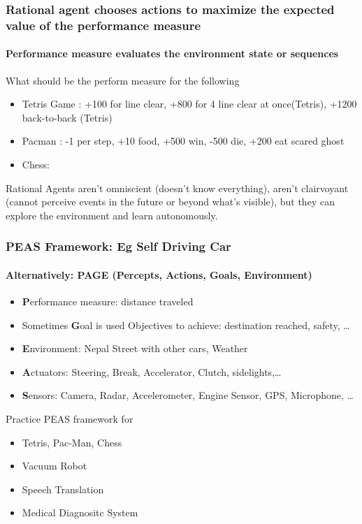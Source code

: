 \documentclass{beamer}
\begin{document}
\begin{frame}
  \frametitle{Rational agent chooses actions to maximize the expected value of the performance measure}
  \framesubtitle{Performance measure evaluates the environment state or sequences}
  What should be the perform measure for the following

  \begin{itemize}
    \item Tetris Game : +100 for line clear, +800 for 4 line clear at once(Tetris), +1200 back-to-back (Tetris)
    \item Pacman : -1 per step, +10 food, +500 win, -500 die, +200 eat scared ghost
    \item Chess:
  \end{itemize}
  
  Rational Agents aren't omniscient (doesn't know everything), aren't clairvoyant (cannot perceive events in the future or beyond what's visible), but they can explore the environment and learn autonomously.

\end{frame}

\begin{frame}
  \frametitle{PEAS Framework: Eg Self Driving Car}
  \framesubtitle{Alternatively: PAGE (Percepts, Actions, Goals, Environment)}
  \begin{itemize}
    \item \textbf{P}erformance measure: distance traveled
    \item Sometimes \textbf{G}oal is used Objectives to achieve: destination reached, safety, \dots
    \item \textbf{E}nvironment: Nepal Street with other cars, Weather
    \item \textbf{A}ctuators: Steering, Break, Accelerator, Clutch, sidelights,\dots
    \item \textbf{S}ensors: Camera, Radar, Accelerometer, Engine Sensor, GPS, Microphone, \dots
  \end{itemize}

  Practice PEAS framework for 
  \begin{itemize}
    \item Tetris, Pac-Man, Chess
    \item Vacuum Robot
    \item Speech Translation
    \item Medical Diagnositc System
  \end{itemize}

\end{frame}
\end{document}
